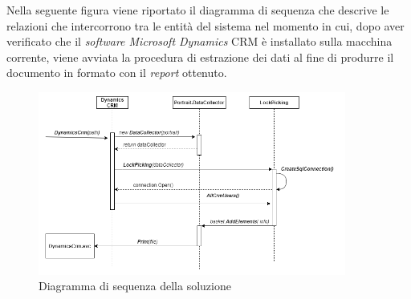 Nella seguente figura viene riportato il diagramma di sequenza che descrive le relazioni che intercorrono tra le entità del sistema nel momento in cui, dopo aver verificato che il \emph{software Microsoft Dynamics} CRM è installato sulla macchina corrente, viene avviata la procedura di estrazione dei dati al fine di produrre il documento in formato  con il \emph{report} ottenuto.
\begin{figure}[H]
\centering
\captionsetup{justification=centering,margin=2cm}
\includegraphics[width=0.9\textwidth ]{figures/sequenzaspettacolare.png}
\caption [ Diagramma di sequenza della soluzione]{ Diagramma di sequenza della soluzione \label{fig:seqdia}}
\end{figure}
